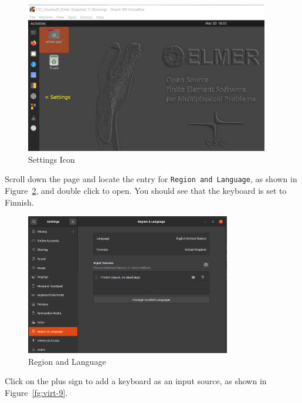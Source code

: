 \begin{figure}[H]
\begin{center}
\includegraphics[width=0.95\textwidth]{virt-7}
\caption{Settings Icon}\label{fg:virt-7}
\end{center}
\end{figure}

Scroll down the page and locate the entry for \texttt{Region and Language}, as shown in Figure~\ref{fg:virt-8}, and double click to open.  You should see that the keyboard is set to Finnish.

\begin{figure}[H]
\begin{center}
\includegraphics[width=0.8\textwidth]{virt-8}
\caption{Region and Language}\label{fg:virt-8}
\end{center}
\end{figure}

Click on the plus sign to add a keyboard as an input source, as shown in Figure~\ref{fg:virt-9}.

